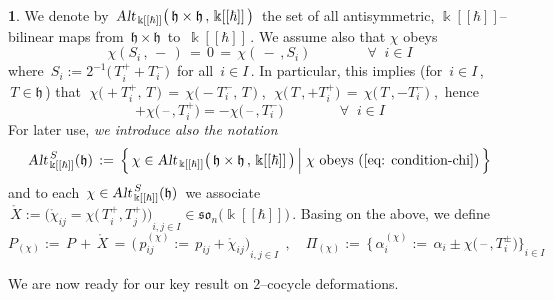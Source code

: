 \documentclass[12pt,reqno,twoside,a4paper]{amsart}
\numberwithin{equation}{section}
\theoremstyle{definition}
\newtheorem{free text}[lema]{}
\theoremstyle{remark}
\def \kh{{\Bbbk[[\hbar]]}}
\def \lieh{\mathfrak{h}}
\def \lieso{\mathfrak{so}}
\theoremstyle{plain}
\begin{document}
\begin{free text}
   We denote by  $ \, \text{\sl Alt}_{\,\kh}\big(\, \lieh \times \lieh \, , \, \kh \,\big) \, $  the set of all antisymmetric,
   $ \kh $--bilinear  maps from  $\, \lieh \times \lieh \, $  to  $ \, \kh \, $.
   We assume also that  $ \chi $  obeys
%
\begin{equation}  \label{eq: condition-chi}
%
  \chi(S_i \, ,\,-\,)  \, = \,  0  \, = \,  \chi(\,-\,,S_i)   \qquad \qquad \forall \;\; i \in I
%
\end{equation}
%
 where  $ \, S_i := 2^{-1} \big(\, T^+_i + T^-_i \big) \, $  for all  $ \, i \in I \, $.  In particular,
 this implies  (for  $ \, i \in I \, $,  $ \, T \in \lieh \, $)  that
  $ \; \chi\big( +T_i^+ , \, T \,\big)  \, = \,  \chi\big( -T_i^- , \, T \,\big) \; $,  $ \; \chi\big(\, T \, , +T_i^+ \big)  \, = \,  \chi\big(\, T \, , -T_i^- \big) \; $,
%
 \,hence
%
\begin{equation}  \label{eq: condition-chi-chit}
%
 +\chi\big(\, \text{--} \, , T_i^+ \big) = -\chi\big(\, \text{--} \, , T_i^- \big)   \qquad \qquad  \forall \;\; i \in I
%
\end{equation}
%
 For later use,  \textit{we introduce also the notation}
%
\begin{equation}  \label{eq: def-Alt_S}
%
 \text{\sl Alt}_{\,\kh}^{\,S}(\lieh)  \, := \,
 \Big\{\, \chi \in \text{\sl Alt}_{\,\kh}\big(\, \lieh \times \lieh \, , \, \kh \,\big) \,\Big|\; \chi \text{\ obeys\ }  (\ref{eq: condition-chi}) \,\Big\}
%
\end{equation}
%
 and to each  $ \, \chi \in  \text{\sl Alt}_{\,\kh}^{\,S}(\lieh)  \, $  we associate
%
  $ \, \mathring{X} := {\Big( \mathring{\chi}_{i{}j} = \chi\big(\,T_i^+,T_j^+\big) \!\Big)}_{i, j \in I} \! \in \lieso_n\big(\kh\big) \, $.
%
 \vskip5pt
%
  Basing on the above, we define
%
  $$
  P_{(\chi)}  := \,  P \, + \, \mathring{X}  \, = \,  {\Big(\, p^{(\chi)}_{i{}j} := \,  p_{ij} + \mathring{\chi}_{i{}j} \Big)}_{\! i, j \in I}  \;\, ,  \!\quad
   \Pi_{(\chi)}  := \,  {\Big\{\, \alpha_i^{(\chi)}  := \,
   \alpha_i \pm \chi\big(\, \text{--} \, , T_i^\pm \big)  \Big\}}_{i \in I}
   $$
%
\end{free text}

\vskip7pt

   We are now ready for our key result on  $ 2 $--cocycle  deformations.

\vskip13pt
\end{document}
